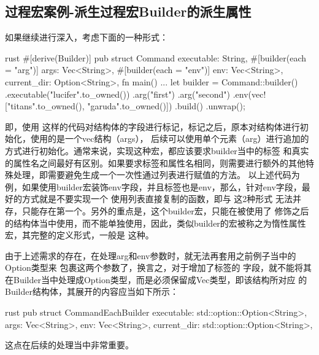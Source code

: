 \subsection{过程宏案例-派生过程宏Builder的派生属性}
\label{builder_attribute}
如果继续进行深入，考虑下面的一种形式：
\begin{code-block}{rust}
#[derive(Builder)]
pub struct Command {
    executable: String,
    #[builder(each = "arg")]
    args: Vec<String>,
    #[builder(each = "env")]
    env: Vec<String>,
    current_dir: Option<String>,
}
fn main() {
    ...
    let builder = Command::builder()
        .executable("lucifer".to_owned())
        .arg("first")
        .arg("second")
        .env(vec!["titans".to_owned(), "garuda".to_owned()])
        .build()
        .unwrap();
}
\end{code-block}
即，使用
这样的代码对结构体的字段进行标记，标记之后，原本对结构体进行初始化，使用的是一个vec结构（args），
后续可以使用单个元素（arg）进行追加的方式进行初始化。通常来说，实现这种宏，都应该要求builder当中的标签
和真实的属性名之间最好有区别。如果要求标签和属性名相同，则需要进行额外的其他特殊处理，即需要避免生成一个一次性通过列表进行赋值的方法。
以上述代码为例，如果使用builder宏装饰env字段，并且标签也是env，那么，针对env字段，最好的方式就是不要实现一个
使用列表直接复制的函数，即与
这2种形式
无法并存，只能存在第一个。另外的重点是，这个builder宏，只能在被使用了
修饰之后的结构体当中使用，而不能单独使用，因此，类似builder的宏被称之为惰性属性
宏，其完整的定义形式，一般是
这种。

由于上述需求的存在，在处理arg和env参数时，就无法再套用之前例子当中的Option类型来
包裹这两个参数了，换言之，对于增加了标签的
字段，就不能将其在Builder当中处理成Option类型，而是必须保留成Vec类型，即该结构所对应
的Builder结构体，其展开的内容应当如下所示：
\begin{code-block}{rust}
pub struct CommandEachBuilder {
    executable: std::option::Option<String>,
    args: Vec<String>,
    env: Vec<String>,
    current_dir: std::option::Option<String>,
}
\end{code-block}
这点在后续的处理当中非常重要。

